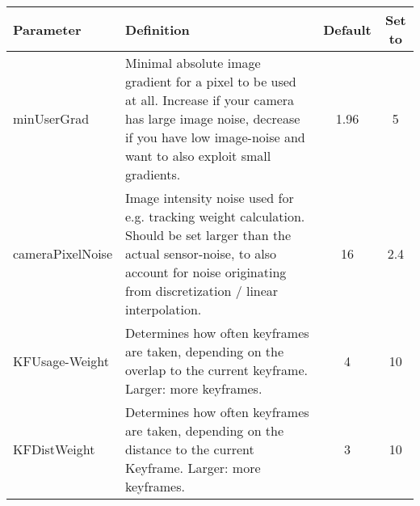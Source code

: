 \begin{table}[h]
\centering
    \begin{tabular}{L{2cm} L{9cm} c c}
    \hline
    Parameter                    & Definition                                                                                                                                                                                                                                                                            & Default & Set to \\ \hline
    minUserGrad                  & Minimal absolute image gradient for a pixel to be used at all. Increase if your camera has large image noise, decrease if you have low image-noise and want to also exploit small gradients.                                                                                          & 1.96    & 5      \\ \hline
    cameraPixelNoise             & Image intensity noise used for e.g. tracking weight calculation. Should be set larger than the actual sensor-noise, to also account for noise originating from discretization / linear interpolation.                                                                                 & 16      & 2.4    \\ \hline
    KFUsage-Weight                & Determines how often keyframes are taken, depending on the overlap to the current keyframe. Larger: more keyframes.                                                                                                                                                                 & 4       & 10     \\ \hline
    KFDistWeight                 & Determines how often keyframes are taken, depending on the distance to the current Keyframe. Larger: more keyframes.                                                                                                                                                                & 3       & 10     \\ \hline

    \end{tabular}
\end{table}

